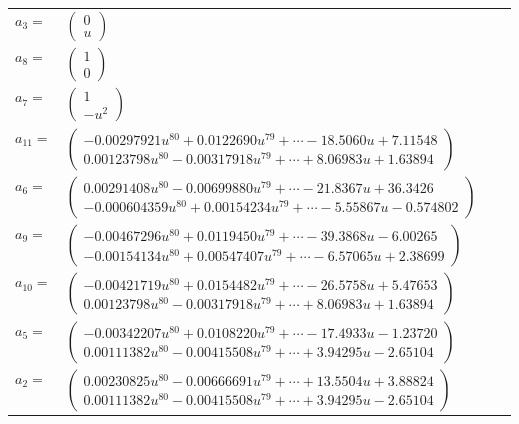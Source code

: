 \documentclass[1p]{elsarticle_modified}
\theoremstyle{definition}
\begin{document}
\begin{tabular}{m{7pt} m{180pt} m{7pt} m{180pt} }
\flushright $a_{3}=$&$\begin{pmatrix}0\\u\end{pmatrix}$ \\
\flushright $a_{8}=$&$\begin{pmatrix}1\\0\end{pmatrix}$ \\
\flushright $a_{7}=$&$\begin{pmatrix}1\\- u^2\end{pmatrix}$ \\
\flushright $a_{11}=$&$\begin{pmatrix}-0.00297921 u^{80}+0.0122690 u^{79}+\cdots-18.5060 u+7.11548\\0.00123798 u^{80}-0.00317918 u^{79}+\cdots+8.06983 u+1.63894\end{pmatrix}$ \\
\flushright $a_{6}=$&$\begin{pmatrix}0.00291408 u^{80}-0.00699880 u^{79}+\cdots-21.8367 u+36.3426\\-0.000604359 u^{80}+0.00154234 u^{79}+\cdots-5.55867 u-0.574802\end{pmatrix}$ \\
\flushright $a_{9}=$&$\begin{pmatrix}-0.00467296 u^{80}+0.0119450 u^{79}+\cdots-39.3868 u-6.00265\\-0.00154134 u^{80}+0.00547407 u^{79}+\cdots-6.57065 u+2.38699\end{pmatrix}$ \\
\flushright $a_{10}=$&$\begin{pmatrix}-0.00421719 u^{80}+0.0154482 u^{79}+\cdots-26.5758 u+5.47653\\0.00123798 u^{80}-0.00317918 u^{79}+\cdots+8.06983 u+1.63894\end{pmatrix}$ \\
\flushright $a_{5}=$&$\begin{pmatrix}-0.00342207 u^{80}+0.0108220 u^{79}+\cdots-17.4933 u-1.23720\\0.00111382 u^{80}-0.00415508 u^{79}+\cdots+3.94295 u-2.65104\end{pmatrix}$ \\
\flushright $a_{2}=$&$\begin{pmatrix}0.00230825 u^{80}-0.00666691 u^{79}+\cdots+13.5504 u+3.88824\\0.00111382 u^{80}-0.00415508 u^{79}+\cdots+3.94295 u-2.65104\end{pmatrix}$ \\

\end{tabular}
\end{document}
